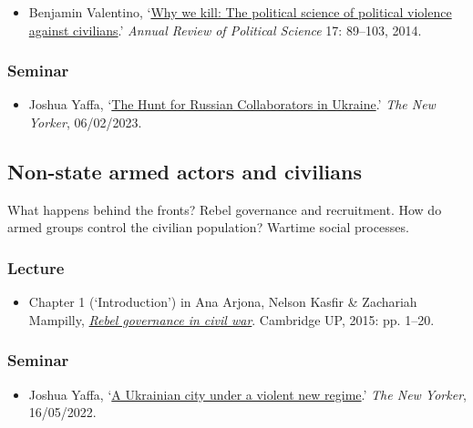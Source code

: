 \documentclass[12pt, a4paper]{article}
\begin{document}
\begin{itemize}
\setlength\itemsep{0pt}
\item Benjamin Valentino, `\href{https://doi.org/10.1146/annurev-polisci-082112-141937}{Why we kill: The political science of political violence against civilians}.' \textit{Annual Review of Political Science} 17: 89--103, 2014.
\end{itemize}

\subsubsection*{Seminar}

\begin{itemize}
\setlength\itemsep{0pt}
\item Joshua Yaffa, `\href{https://www.newyorker.com/magazine/2023/02/06/the-hunt-for-russian-collaborators-in-ukraine}{The Hunt for Russian Collaborators in Ukraine}.' \textit{The New Yorker}, 06/02/2023.
\end{itemize}

\hline %

\subsection{Non-state armed actors and civilians}\label{rebels}

What happens behind the fronts? Rebel governance and recruitment. How do armed groups control the civilian population? Wartime social processes.

\subsubsection*{Lecture}

\begin{itemize}
\setlength\itemsep{0pt}
\item Chapter 1 (`Introduction') in Ana Arjona, Nelson Kasfir \& Zachariah Mampilly, \href{https://doi.org/10.1017/CBO9781316182468}{\textit{Rebel governance in civil war}}. Cambridge UP, 2015: pp. 1--20.
\end{itemize}

\subsubsection*{Seminar}

\begin{itemize}
\setlength\itemsep{-5pt}
\item Joshua Yaffa, `\href{https://www.newyorker.com/magazine/2022/05/23/a-ukrainian-city-under-a-violent-new-regime}{A Ukrainian city under a violent new regime}.' \textit{The New Yorker}, 16/05/2022.
\end{itemize}
\end{document}
